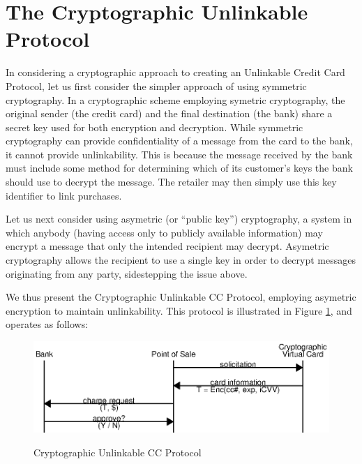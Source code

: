 \section{The Cryptographic Unlinkable Protocol}
\label{sec:unlinkable-cryptographic}

In considering a cryptographic approach to creating an Unlinkable Credit Card Protocol, let us first consider the simpler approach of using symmetric cryptography.
In a cryptographic scheme employing symetric cryptography,
    the original sender (the credit card) and the final destination (the bank) share a secret key used for both encryption and decryption.
While symmetric cryptography can provide confidentiality of a message from the card to the bank, it cannot provide unlinkability.
This is because the message received by the bank must include some method for determining which of its customer's keys the bank should use to decrypt the message.
The retailer may then simply use this key identifier to link purchases.

Let us next consider using asymetric (or ``public key'') cryptography,
  a system in which anybody (having access only to publicly available information) may encrypt a message that only the intended recipient may decrypt.
Asymetric cryptography allows the recipient to use a single key in order to decrypt messages originating from any party, sidestepping the issue above.

We thus present the Cryptographic Unlinkable CC Protocol, employing asymetric encryption to maintain unlinkability.
This protocol is illustrated in Figure \ref{fig:cryptographic-cpp}, and operates as follows:

\begin{figure}[h]
  \caption{Cryptographic Unlinkable CC Protocol}
  \centering
    \includegraphics{img/cryptographic-cpp.eps}
  \label{fig:cryptographic-cpp}
\end{figure}

